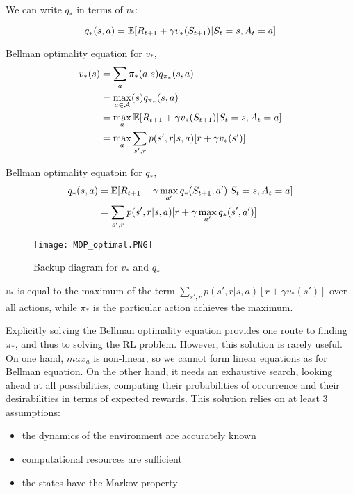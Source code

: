 \documentclass[sutton_barto_notes.tex]{subfiles}
\begin{document}
We can write $q_*$ in terms of $v_*$:

$$ q_*(s,a) = \operatorname*{\mathbb{E}} [R_{t+1} + \gamma v_* (S_{t+1}) | S_t = s, A_t = a] $$

\begin{definition}
Bellman optimality equation for $v_*$,
\begin{align*}
v_*(s) &= \sum_a \pi_* (a|s) q_{\pi_*} (s,a) \\
& = \max_{a\in\mathcal{A}}(s) q_{\pi_*} (s,a) \\
& = \max_a \operatorname*{\mathbb{E}} [R_{t+1} + \gamma v_* (S_{t+1}) | S_t = s, A_t = a] \\
& = \max_a \sum_{s',r} p(s',r|s,a)[r+\gamma v_*(s')]
\end{align*}
\end{definition}

\begin{definition}
Bellman optimality equatoin for $q_*$,
\begin{align*}
q_*(s,a) & = \operatorname*{\mathbb{E}} [R_{t+1} + \gamma \max_{a'} q_*(S_{t+1}, a') | S_t = s, A_t = a] \\
& = \sum_{s',r} p(s',r|s,a)[r+\gamma \max_{a'} q_*(s',a')]
\end{align*}
\end{definition}

\begin{figure}[!h]
  \centering
  \texttt{[image: MDP\_optimal.PNG]}
  \caption{Backup diagram for $v_*$ and $q_*$}
  \label{fig:MDP_optimal}
\end{figure}

$v_*$ is equal to the maximum of the term $\sum_{s',r} p(s',r|s,a)[r+\gamma v_*(s')]$ over all actions, while $\pi_*$ is the particular action achieves the maximum.
\newline

Explicitly solving the Bellman optimality equation provides one route to finding $\pi_*$, and thus to solving the RL problem.
However, this solution is rarely useful.
On one hand, $max_a$ is non-linear, so we cannot form linear equations as for Bellman equation.
On the other hand, it needs an exhaustive search, looking ahead at all possibilities, computing their probabilities of occurrence and their desirabilities in terms of expected rewards.
This solution relies on at least 3 assumptions:
\begin{itemize}
\item the dynamics of the environment are accurately known
\item computational resources are sufficient
\item the states have the Markov property
\end{itemize}
\end{document}
